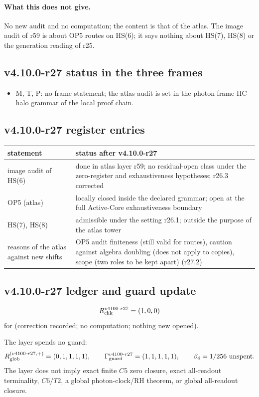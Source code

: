 \paragraph{What this does not give.}
No new audit and no computation; the content is that of the atlas.  The image audit of r59 is about OP5 routes on HS(6); it says nothing
about HS(7), HS(8) or the generation reading of r25.

\subsection*{v4.10.0-r27 status in the three frames}
\label{subsec:v4100-r27-frames}

\begin{itemize}[leftmargin=2em]
\item M, T, P: no frame statement; the atlas audit is set in the photon-frame HC-halo grammar of the local proof chain.
\end{itemize}

\subsection*{v4.10.0-r27 register entries}
\label{subsec:v4100-r27-register}

\begin{center}
\small
\begin{tabular}{@{}>{\raggedright\arraybackslash}p{}>{\raggedright\arraybackslash}p{}@{}}
\toprule
statement & status after v4.10.0-r27\\
\midrule
image audit of HS(6) & done in atlas layer r59; no residual-open class under the zero-register and exhaustiveness hypotheses; r26.3 corrected\\
OP5 (atlas) & locally closed inside the declared grammar; open at the full Active-Core exhaustiveness boundary\\
HS(7), HS(8) & admissible under the setting r26.1; outside the purpose of the atlas tower\\
reasons of the atlas against new shifts & OP5 audit finiteness (still valid for routes), caution against algebra doubling (does not apply to copies), scope (two roles to be kept apart) (r27.2)\\
\bottomrule
\end{tabular}
\end{center}

\subsection*{v4.10.0-r27 ledger and guard update}
\label{subsec:v4100-r27-ledger-guard}

\[
R_{\rm chk}^{v4100\text{-}r27}=(1,0,0)
\]
for (correction recorded; no computation; nothing new opened).

The layer spends no guard:
\[
R_{\rm glob}^{(v4100\text{-}r27,+)}=(0,1,1,1,1),
\qquad
\Gamma_{\rm guard}^{v4100\text{-}r27}=(1,1,1,1,1),
\qquad
\beta_4=1/256\ \text{unspent}.
\]
The layer does not imply exact finite \(C5\) zero closure, exact all-readout terminality, \(C6/T2\), a global photon-clock/RH theorem,
or global all-readout closure.
